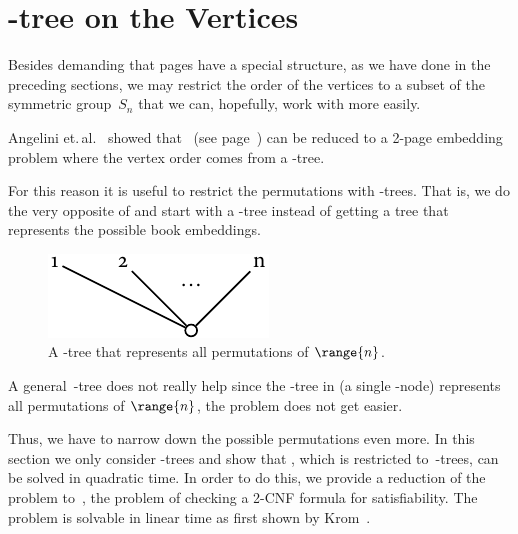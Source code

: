 \section{\PQ-tree on the Vertices}
\label{section:trees}

\noindent 

Besides demanding that pages have a special structure, as we have
done in the preceding sections, we may
restrict the order of the vertices to a subset
of the symmetric group~$S_n$ that we can, hopefully, work with more easily. 

Angelini et.\,al.~\cite{angelini11} showed that \SEFECON~(see page~\pageref{prob:sefecon}) can be reduced to a 2-page embedding problem where the vertex order comes from a \PT-tree.

For this reason it is useful to restrict the permutations with \PQ-trees. That is, we do
the very opposite of  and start with a \PQ-tree
instead of getting a tree that represents the possible book embeddings.

\begin{figure}[\placement]\centering
    \includegraphics{figures/t_pq-all}
    \caption[\PQ-tree that represents all permutations]{A \PQ-tree that represents all permutations of $\range{n}$.}
    \label{figure:pq-all}
\end{figure}

A general~\PQ-tree does not really help
since the \PQ-tree in  (a single \PT-node) represents all permutations of $\range{n}$,
\ie the problem does not get easier.

Thus, we have to narrow down the possible permutations even more. In this section we only consider
\Q-trees and show that \probQTree, which is \probBook restricted to~\Q-trees,
can be solved in quadratic time. In order to do this, we provide a reduction of the problem to~\probTwoSat, the problem of checking a 2-CNF formula for satisfiability. 
The \probTwoSat problem is solvable in linear time as first shown by Krom~\cite{Krom67}.


